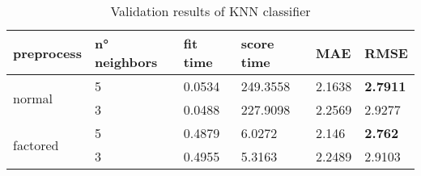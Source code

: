 \begin{table}[H]
    \centering
    \begin{tabular}{l|lllll}
    \toprule
    \textbf{preprocess} & \textbf{n° neighbors} & \textbf{fit time} & \textbf{score time} & \textbf{MAE} & \textbf{RMSE} \\ \midrule
    \multirow{2}{*}{normal}     & 5 & 0.0534 & 249.3558 & 2.1638 & \textbf{2.7911} \\
                                & 3 & 0.0488 & 227.9098 & 2.2569 & 2.9277 \\
                                \midrule
    \multirow{2}{*}{factored}   & 5 & 0.4879 & 6.0272 & 2.146  & \textbf{2.762}  \\
                                & 3 & 0.4955 & 5.3163 & 2.2489 & 2.9103 \\
    \bottomrule     
    \end{tabular}
    \caption{Validation results of KNN classifier}
    \label{tab:val_knn}
    \end{table}

